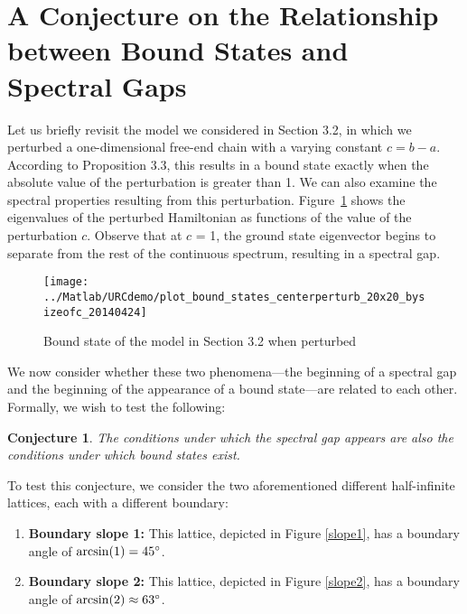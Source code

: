 \documentclass{article}
\newtheorem*{conjecture}{Conjecture}
\numberwithin{equation}{section}
\numberwithin{theorem}{section}
\numberwithin{proposition}{section}
\numberwithin{lemma}{section}
\numberwithin{corollary}{section}
\numberwithin{definition}{section}
\begin{document}
\section[A Conjecture on the Relationship between Bound States \\ and Spectral Gaps]{\sloppy A Conjecture on the Relationship between Bound States and Spectral Gaps}

Let us briefly revisit the model we considered in Section 3.2, in which we perturbed a one-dimensional free-end chain with a varying constant $c = b - a$. According to Proposition 3.3, this results in a bound state exactly when the absolute value of the perturbation is greater than 1. We can also examine the spectral properties resulting from this perturbation. Figure~\ref{boundstateperturb} shows the eigenvalues of the perturbed Hamiltonian as functions of the value of the perturbation $c$. Observe that at $c$ = 1, the ground state eigenvector begins to separate from the rest of the continuous spectrum, resulting in a spectral gap.
\begin{figure}
\caption{Bound state of the model in Section 3.2 when perturbed	\label{boundstateperturb}}
\texttt{[image: ../Matlab/URCdemo/plot\_bound\_states\_centerperturb\_20x20\_bysizeofc\_20140424]}
\end{figure}

We now consider whether these two phenomena---the beginning of a spectral gap and the beginning of the appearance of a bound state---are related to each other. Formally, we wish to test the following:
\begin{conjecture}
	The conditions under which the spectral gap appears are also the conditions under which bound states exist.
\end{conjecture}
To test this conjecture, we consider the two aforementioned different half-infinite lattices, each with a different boundary:
\begin{enumerate}
	\item \textbf{Boundary slope 1:} This lattice, depicted in Figure \ref{slope1},  has a boundary angle of $\arcsin(1) = 45\degree$.
	\item \textbf{Boundary slope 2:} This lattice, depicted in Figure \ref{slope2},  has a boundary angle of $\arcsin(2) \approx 63\degree$.
\end{enumerate}
\end{document}
